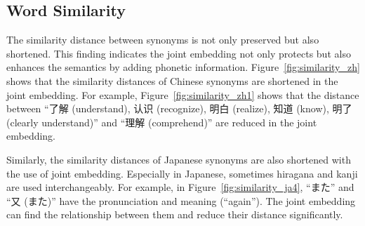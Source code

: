 \subsection{Word Similarity} \label{sec:analysis_similarity}
\begin{CJK}{UTF8}{gbsn}
    The similarity distance between synonyms is not only preserved but also shortened. This finding indicates the joint embedding not only protects but also enhances the semantics by adding phonetic information. Figure~\ref{fig:similarity_zh} shows that the similarity distances of Chinese synonyms are shortened in the joint embedding. For example, Figure~\ref{fig:similarity_zh1} shows that the distance between ``了解 (understand), 认识 (recognize), 明白 (realize), 知道 (know), 明了 (clearly understand)'' and ``理解 (comprehend)'' are reduced in the joint embedding.

    
    
    
\end{CJK}

\begin{CJK}{UTF8}{ipxm}
    Similarly, the similarity distances of Japanese synonyms are also shortened with the use of joint embedding. Especially in Japanese, sometimes hiragana and kanji are used interchangeably. For example, in Figure~\ref{fig:similarity_ja4}, ``また'' and ``又 (また)'' have the pronunciation and meaning (``again''). The joint embedding can find the relationship between them and reduce their distance significantly.
\end{CJK}

